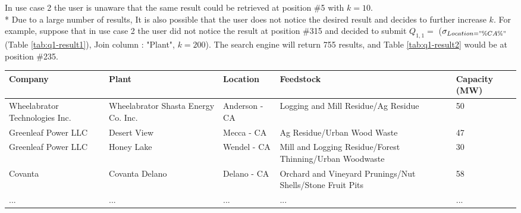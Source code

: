 In use case 2 the user is unaware that the same result could be retrieved at position \#5 with $k = 10$.  \\* Due to a large number of results, It is also possible that the user does not notice the desired result and decides to further increase $k$. For example, suppose that in use case 2 the user did not notice the result at position \#315 and decided to submit $Q_{1,1} =$ ($\sigma_{Location = "\%CA\%"}$(Table \ref{tab:q1-result1}), Join column : "Plant", $k = 200$). The search engine will return 755 results, and Table \ref{tab:q1-result2} would be at position \#235.

\begin{table*}[!ht]
	\setlength\extrarowheight{2pt} %
	\begin{tabular}{ |l|p{2cm}|p{3cm}|p{2cm}|l|  }
		\hline
		\textbf{Company}&	\textbf{Plant}&	\textbf{Location}&	\textbf{Feedstock}&	\textbf{Capacity (MW)}\\
		\hline
		Wheelabrator Technologies Inc.& 	Wheelabrator Shasta Energy Co. Inc.& 	Anderson - CA& 	Logging and Mill Residue/Ag Residue& 	50\\
		\hline
		Greenleaf Power LLC& 	Desert View& 	Mecca - CA& 	Ag Residue/Urban Wood Waste& 	47\\
		\hline
		Greenleaf Power LLC& 	Honey Lake& 	Wendel - CA&	Mill and Logging Residue/Forest Thinning/Urban Woodwaste& 	30\\
		\hline
		Covanta& 	Covanta Delano& 	Delano - CA& 	Orchard and Vineyard Prunings/Nut Shells/Stone Fruit Pits& 	58\\
		\hline
		... & ... & ... & ... & ...\\
		\hline
		
	\end{tabular}
	\vspace{.2cm}
	\caption{U.S. Biomass Power Plants\label{tab:q1-result1}}
\end{table*}
	

